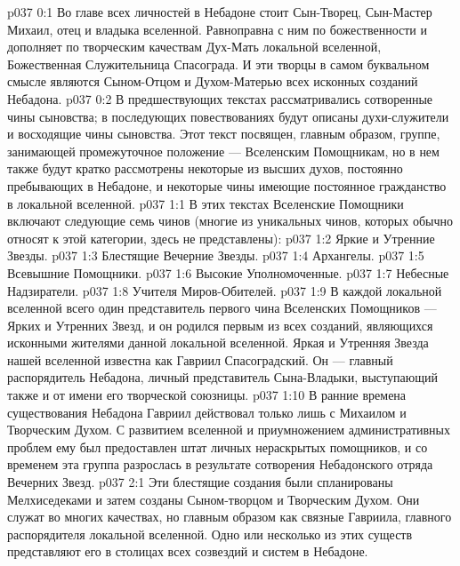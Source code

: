 \author{Блестящая Вечерняя Звезда}
\vs p037 0:1 Во главе всех личностей в Небадоне стоит Сын\hyp{}Творец, Сын\hyp{}Мастер Михаил, отец и владыка вселенной. Равноправна с ним по божественности и дополняет по творческим качествам Дух\hyp{}Мать локальной вселенной, Божественная Служительница Спасограда. И эти творцы в самом буквальном смысле являются Сыном\hyp{}Отцом и Духом\hyp{}Матерью всех исконных созданий Небадона.
\vs p037 0:2 В предшествующих текстах рассматривались сотворенные чины сыновства; в последующих повествованиях будут описаны духи\hyp{}служители и восходящие чины сыновства. Этот текст посвящен, главным образом, группе, занимающей промежуточное положение --- Вселенским Помощникам, но в нем также будут кратко рассмотрены некоторые из высших духов, постоянно пребывающих в Небадоне, и некоторые чины имеющие постоянное гражданство в локальной вселенной.
\vs p037 1:1 В этих текстах Вселенские Помощники включают следующие семь чинов (многие из уникальных чинов, которых обычно относят к этой категории, здесь не представлены):
\vs p037 1:2 \bibnobreakspace Яркие и Утренние Звезды.
\vs p037 1:3 \bibnobreakspace Блестящие Вечерние Звезды.
\vs p037 1:4 \bibnobreakspace Архангелы.
\vs p037 1:5 \bibnobreakspace Всевышние Помощники.
\vs p037 1:6 \bibnobreakspace Высокие Уполномоченные.
\vs p037 1:7 \bibnobreakspace Небесные Надзиратели.
\vs p037 1:8 \bibnobreakspace Учителя Миров\hyp{}Обителей.
\vs p037 1:9 \pc В каждой локальной вселенной всего один представитель первого чина Вселенских Помощников --- Ярких и Утренних Звезд, и он родился первым из всех созданий, являющихся исконными жителями данной локальной вселенной. Яркая и Утренняя Звезда нашей вселенной известна как Гавриил Спасоградский. Он --- главный распорядитель Небадона, личный представитель Сына\hyp{}Владыки, выступающий также и от имени его творческой союзницы.
\vs p037 1:10 В ранние времена существования Небадона Гавриил действовал только лишь с Михаилом и Творческим Духом. С развитием вселенной и приумножением административных проблем ему был предоставлен штат личных нераскрытых помощников, и со временем эта группа разрослась в результате сотворения Небадонского отряда Вечерних Звезд.
\vs p037 2:1 Эти блестящие создания были спланированы Мелхиседеками и затем созданы Сыном\hyp{}творцом и Творческим Духом. Они служат во многих качествах, но главным образом как связные Гавриила, главного распорядителя локальной вселенной. Одно или несколько из этих существ представляют его в столицах всех созвездий и систем в Небадоне.
